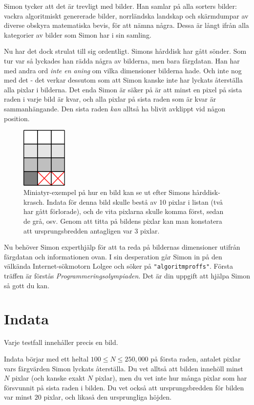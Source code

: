 
Simon tycker att det är trevligt med bilder. Han samlar på alla sorters bilder:
vackra algoritmiskt genererade bilder, norrländska landskap och skärmdumpar av
diverse obskyra matematiska bevis, för att nämna några. Dessa är långt ifrån
alla kategorier av bilder som Simon har i sin samling.

Nu har det dock strulat till sig ordentligt. Simons hårddisk har gått sönder.
Som tur var så lyckades han rädda några av bilderna, men bara färgdatan. Han
har med andra ord \emph{inte en aning} om vilka dimensioner bilderna hade. Och
inte nog med det - det verkar dessutom som att Simon kanske inte har lyckats
återställa alla pixlar i bilderna. Det enda Simon är säker på är att minst en
pixel på sista raden i varje bild är kvar, och alla pixlar på sista raden som
är kvar är sammanhängande. Den sista raden \emph{kan} alltså ha blivit avklippt
vid någon position.

\begin{figure}[ht!]
\centering
\includegraphics[width=0.2\textwidth]{example.png}
\caption{Miniatyr-exempel på hur en bild kan se ut efter Simons hårddisk-krasch. Indata
för denna bild skulle bestå av 10 pixlar i listan (två har gått förlorade), och de vita
pixlarna skulle komma först, sedan de grå, osv. Genom att titta på bildens pixlar kan
man konstatera att ursprungsbredden antagligen var 3 pixlar.}
\end{figure}

Nu behöver Simon experthjälp för att ta reda på bildernas dimensioner utifrån
färgdatan och informationen ovan. I sin desperation går Simon in på den
välkända Internet-sökmotorn Lolgee och söker på \texttt{"algoritmproffs"}.
Första träffen är förstås \emph{Programmeringsolympiaden}. Det är din uppgift
att hjälpa Simon så gott du kan.

\section*{Indata}
Varje testfall innehåller precis en bild.

Indata börjar med ett heltal $100 \leq N \leq 250,000$ på första raden, antalet pixlar vars
färgvärden Simon lyckats återställa. Du vet alltså att bilden innehöll minst
$N$ pixlar (och kanske exakt $N$ pixlar), men du vet inte hur många pixlar som
har försvunnit på sista raden i bilden. Du vet också att ursprungsbredden för
bilden var minst $20$ pixlar, och likaså den ursprungliga höjden.

